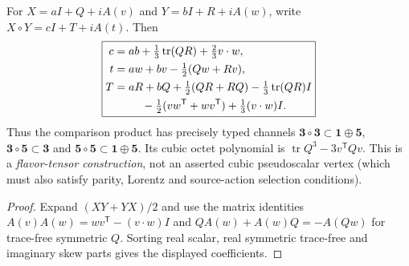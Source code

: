 \documentclass[12pt,a4paper]{article}
\begin{document}
\begin{proposition}
\label{p11:prop:v159-nonet-jordan-coordinate-product}
For $X=aI+Q+iA(v)$ and $Y=bI+R+iA(w)$, write
$X\circ Y=cI+T+iA(t)$. Then
\[
\boxed{\begin{aligned}
 c&=ab+\tfrac13\operatorname{tr}(QR)+\tfrac23v\cdot w,\\
 t&=aw+bv-\tfrac12(Qw+Rv),\\
 T&=aR+bQ+\tfrac12(QR+RQ)
          -\tfrac13\operatorname{tr}(QR)I\\
  &\hspace{2.5em}-\tfrac12(vw^{\mathsf T}+wv^{\mathsf T})
          +\tfrac13(v\cdot w)I.
\end{aligned}}
\]
Thus the comparison product has precisely typed channels
$\mathbf3\circ\mathbf3\subset\mathbf1\oplus\mathbf5$,
$\mathbf3\circ\mathbf5\subset\mathbf3$ and
$\mathbf5\circ\mathbf5\subset\mathbf1\oplus\mathbf5$.
Its cubic octet polynomial is
$\operatorname{tr}Q^3-3v^{\mathsf T}Qv$.
This is a \emph{flavor-tensor construction}, not an asserted cubic
pseudoscalar vertex (which must also satisfy parity, Lorentz and
source-action selection conditions).
\end{proposition}
\begin{proof}
Expand $(XY+YX)/2$ and use the matrix identities
$A(v)A(w)=wv^{\mathsf T}-(v\cdot w)I$ and
$QA(w)+A(w)Q=-A(Qw)$ for trace-free symmetric $Q$.
Sorting real scalar, real symmetric trace-free and imaginary skew
parts gives the displayed coefficients.
\end{proof}
\end{document}
